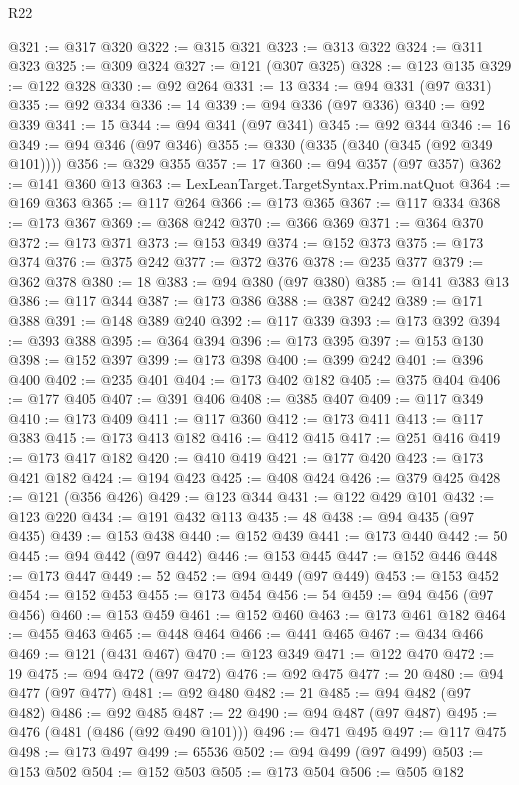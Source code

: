 \begin{lexlean}{R22}
\begin{coremodule}
@321 := @317 @320
@322 := @315 @321
@323 := @313 @322
@324 := @311 @323
@325 := @309 @324
@327 := @121 (@307 @325)
@328 := @123 @135
@329 := @122 @328
@330 := @92 @264
@331 := 13
@334 := @94 @331 (@97 @331)
@335 := @92 @334
@336 := 14
@339 := @94 @336 (@97 @336)
@340 := @92 @339
@341 := 15
@344 := @94 @341 (@97 @341)
@345 := @92 @344
@346 := 16
@349 := @94 @346 (@97 @346)
@355 := @330 (@335 (@340 (@345 (@92 @349 @101))))
@356 := @329 @355
@357 := 17
@360 := @94 @357 (@97 @357)
@362 := @141 @360 @13
@363 := LexLeanTarget.TargetSyntax.Prim.natQuot
@364 := @169 @363
@365 := @117 @264
@366 := @173 @365
@367 := @117 @334
@368 := @173 @367
@369 := @368 @242
@370 := @366 @369
@371 := @364 @370
@372 := @173 @371
@373 := @153 @349
@374 := @152 @373
@375 := @173 @374
@376 := @375 @242
@377 := @372 @376
@378 := @235 @377
@379 := @362 @378
@380 := 18
@383 := @94 @380 (@97 @380)
@385 := @141 @383 @13
@386 := @117 @344
@387 := @173 @386
@388 := @387 @242
@389 := @171 @388
@391 := @148 @389 @240
@392 := @117 @339
@393 := @173 @392
@394 := @393 @388
@395 := @364 @394
@396 := @173 @395
@397 := @153 @130
@398 := @152 @397
@399 := @173 @398
@400 := @399 @242
@401 := @396 @400
@402 := @235 @401
@404 := @173 @402 @182
@405 := @375 @404
@406 := @177 @405
@407 := @391 @406
@408 := @385 @407
@409 := @117 @349
@410 := @173 @409
@411 := @117 @360
@412 := @173 @411
@413 := @117 @383
@415 := @173 @413 @182
@416 := @412 @415
@417 := @251 @416
@419 := @173 @417 @182
@420 := @410 @419
@421 := @177 @420
@423 := @173 @421 @182
@424 := @194 @423
@425 := @408 @424
@426 := @379 @425
@428 := @121 (@356 @426)
@429 := @123 @344
@431 := @122 @429 @101
@432 := @123 @220
@434 := @191 @432 @113
@435 := 48
@438 := @94 @435 (@97 @435)
@439 := @153 @438
@440 := @152 @439
@441 := @173 @440
@442 := 50
@445 := @94 @442 (@97 @442)
@446 := @153 @445
@447 := @152 @446
@448 := @173 @447
@449 := 52
@452 := @94 @449 (@97 @449)
@453 := @153 @452
@454 := @152 @453
@455 := @173 @454
@456 := 54
@459 := @94 @456 (@97 @456)
@460 := @153 @459
@461 := @152 @460
@463 := @173 @461 @182
@464 := @455 @463
@465 := @448 @464
@466 := @441 @465
@467 := @434 @466
@469 := @121 (@431 @467)
@470 := @123 @349
@471 := @122 @470
@472 := 19
@475 := @94 @472 (@97 @472)
@476 := @92 @475
@477 := 20
@480 := @94 @477 (@97 @477)
@481 := @92 @480
@482 := 21
@485 := @94 @482 (@97 @482)
@486 := @92 @485
@487 := 22
@490 := @94 @487 (@97 @487)
@495 := @476 (@481 (@486 (@92 @490 @101)))
@496 := @471 @495
@497 := @117 @475
@498 := @173 @497
@499 := 65536
@502 := @94 @499 (@97 @499)
@503 := @153 @502
@504 := @152 @503
@505 := @173 @504
@506 := @505 @182

\end{coremodule}
\end{lexlean}
